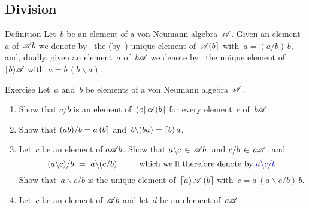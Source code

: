 \documentclass[a]{subfiles}
\begin{document}
\subsection{Division}
\begin{parsec}%
\begin{point}[division]{Definition}%
Let~$b$ be an element of a von Neumann algebra~$\mathscr{A}$.
Given an element~$a$ of~$\mathscr{A} b$ 
we denote by~ 
the (by~) unique
element of~$\mathscr{A}\!\left(b\right\rceil$
with~$a=(a/b)\, b$,
and, dually,
given an element~$a$ of~$b\mathscr{A}$ 
we denote by~ 
the unique
element of~$\left\lceil b\right)\!\mathscr{A}$
with~$a=b\,(b\backslash a)$.
\end{point}
\begin{point}{Exercise}%
Let~$a$ and~$b$
be elements of a von Neumann algebra~$\mathscr{A}$.
\begin{enumerate}
\item
Show that $c/b$ is an element of~$\left(c\right\rceil\!\mathscr{A}\!\left(b\right\rceil$
for every element~$c$ of~$b\mathscr{A}$.
\item
Show that $(ab)/b = a\left(b\right\rceil$
and~$b\backslash (ba)=\left\lceil b\right)a$.
\item
Let~$c$ be an element of $a\mathscr{A} b$.
Show that
$a \backslash c \,\in\, \mathscr{A} b$,
and
$c/b\,\in\,a\mathscr{A}$, and
\begin{equation*}
(a\backslash c)/b\ =\  a\backslash(c/b)
\quad \text{ --- which we'll therefore denote by}\  \Define{a\backslash c/b}.
\end{equation*}
Show that~$a\backslash c/b$
is the unique element of~$\left\lceil a\right)\mathscr{A}\left(b\right\rceil$
with~$c=a\,(a\backslash c / b)\, b$. 
\item
Let~$c$ be an element of~$\mathscr{A} b$
and let~$d$ be an element of~$a\mathscr{A}$.


\end{enumerate}
\end{point}
\end{parsec}
\end{document}
